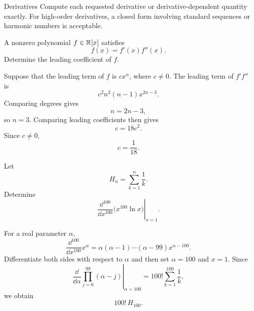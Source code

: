     \begin{expectedproblemgroup}{Derivatives}
        Compute each requested derivative or derivative-dependent quantity
        exactly. For high-order derivatives, a closed form involving standard
        sequences or harmonic numbers is acceptable.

        \begin{expectedsubproblem}[2006 HMMT]
            A nonzero polynomial $f\in\mathbb{R}[x]$ satisfies
            \[
                f(x)=f'(x)f''(x).
            \]
            Determine the leading coefficient of $f$.
        \end{expectedsubproblem}

        \begin{expectedsubsolution}
            Suppose that the leading term of $f$ is $cx^n$, where $c\neq0$. The
            leading term of $f'f''$ is
            \[
                c^2n^2(n-1)x^{2n-3}.
            \]
            Comparing degrees gives
            \[
                n=2n-3,
            \]
            so $n=3$. Comparing leading coefficients then gives
            \[
                c=18c^2.
            \]
            Since $c\neq0$,
            \[
                \boxed{c=\frac{1}{18}}.
            \]
        \end{expectedsubsolution}




        \begin{expectedsubproblem}
            Let
            \[
                H_n=\sum_{k=1}^{n}\frac{1}{k}.
            \]
            Determine
            \[
                \left.
                \frac{\dd^{100}}{\dd x^{100}}
                \bigl(x^{100}\ln x\bigr)
                \right|_{x=1}.
            \]
        \end{expectedsubproblem}

        \begin{expectedsubsolution}
            For a real parameter $\alpha$,
            \[
                \frac{\dd^{100}}{\dd x^{100}}x^\alpha
                =
                \alpha(\alpha-1)\cdots(\alpha-99)x^{\alpha-100}.
            \]
            Differentiate both sides with respect to $\alpha$ and then set
            $\alpha=100$ and $x=1$. Since
            \[
                \left.
                \frac{\dd}{\dd\alpha}
                \prod_{j=0}^{99}(\alpha-j)
                \right|_{\alpha=100}
                =
                100!\sum_{k=1}^{100}\frac{1}{k},
            \]
            we obtain
            \[
                \boxed{100!\,H_{100}}.
            \]
        \end{expectedsubsolution}

    \end{expectedproblemgroup}

